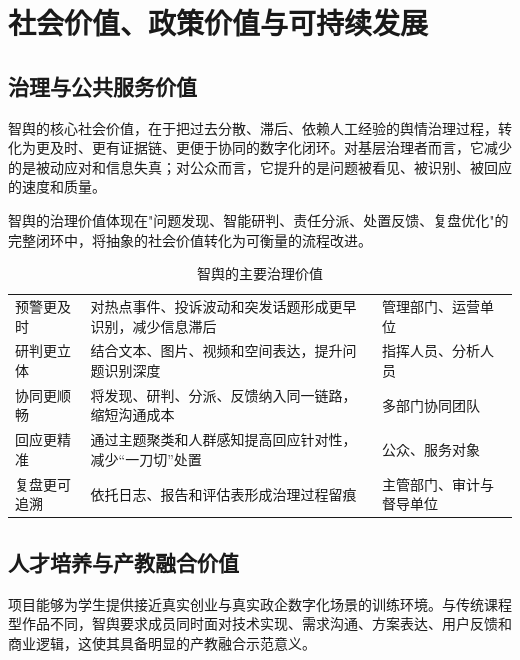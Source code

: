 \chapter{社会价值、政策价值与可持续发展}

\section{治理与公共服务价值}

智舆的核心社会价值，在于把过去分散、滞后、依赖人工经验的舆情治理过程，转化为更及时、更有证据链、更便于协同的数字化闭环。对基层治理者而言，它减少的是被动应对和信息失真；对公众而言，它提升的是问题被看见、被识别、被回应的速度和质量。


智舆的治理价值体现在"问题发现、智能研判、责任分派、处置反馈、复盘优化"的完整闭环中，将抽象的社会价值转化为可衡量的流程改进。


\begin{table}[htbp]
	\centering
	\caption{智舆的主要治理价值}
	\begin{tabularx}{\textwidth}{L{3cm}YL{3cm}}
		\toprule
		 &                &  \\
		\midrule
		预警更及时          & 对热点事件、投诉波动和突发话题形成更早识别，减少信息滞后 & 管理部门、运营单位       \\
		研判更立体          & 结合文本、图片、视频和空间表达，提升问题识别深度     & 指挥人员、分析人员       \\
		协同更顺畅          & 将发现、研判、分派、反馈纳入同一链路，缩短沟通成本    & 多部门协同团队         \\
		回应更精准          & 通过主题聚类和人群感知提高回应针对性，减少“一刀切”处置 & 公众、服务对象         \\
		复盘更可追溯         & 依托日志、报告和评估表形成治理过程留痕          & 主管部门、审计与督导单位    \\
		\bottomrule
	\end{tabularx}
\end{table}

\section{人才培养与产教融合价值}

项目能够为学生提供接近真实创业与真实政企数字化场景的训练环境。与传统课程型作品不同，智舆要求成员同时面对技术实现、需求沟通、方案表达、用户反馈和商业逻辑，这使其具备明显的产教融合示范意义。

